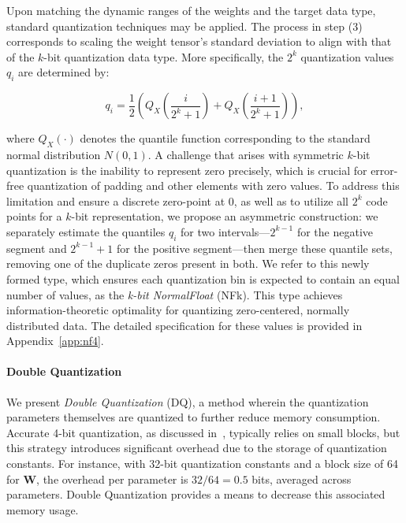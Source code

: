 Upon matching the dynamic ranges of the weights and the target data type, standard quantization techniques may be applied. The process in step (3) corresponds to scaling the weight tensor’s standard deviation to align with that of the $k$-bit quantization data type. More specifically, the $2^k$ quantization values $q_i$ are determined by:

\begin{equation}
q_i  = \frac{1}{2}\left( Q_X\left(\frac{i}{2^k+1}\right) + Q_X\left(\frac{i+1}{2^k+1}\right)\right),
\end{equation}

where $Q_X(\cdot)$ denotes the quantile function corresponding to the standard normal distribution $N(0,1)$. A challenge that arises with symmetric $k$-bit quantization is the inability to represent zero precisely, which is crucial for error-free quantization of padding and other elements with zero values. To address this limitation and ensure a discrete zero-point at $0$, as well as to utilize all $2^k$ code points for a $k$-bit representation, we propose an asymmetric construction: we separately estimate the quantiles $q_i$ for two intervals—$2^{k-1}$ for the negative segment and $2^{k-1}+1$ for the positive segment—then merge these quantile sets, removing one of the duplicate zeros present in both. We refer to this newly formed type, which ensures each quantization bin is expected to contain an equal number of values, as the \emph{k-bit NormalFloat} (NFk). This type achieves information-theoretic optimality for quantizing zero-centered, normally distributed data. The detailed specification for these values is provided in Appendix~\ref{app:nf4}.

\paragraph{Double Quantization{}}
We present \emph{Double Quantization} (DQ), a method wherein the quantization parameters themselves are quantized to further reduce memory consumption. Accurate 4-bit quantization, as discussed in~\citep{dettmers2022case}, typically relies on small blocks, but this strategy introduces significant overhead due to the storage of quantization constants. For instance, with 32-bit quantization constants and a block size of 64 for $\mathbf{W}$, the overhead per parameter is $32/64 = 0.5$ bits, averaged across parameters. Double Quantization provides a means to decrease this associated memory usage.

